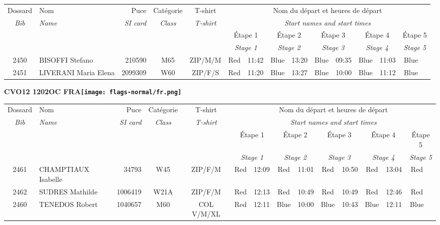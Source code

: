 \documentclass{report}
\begin{document}
  \begin{longtable}{|c|l|r|c|c|*{5}{cc|}}
    Dossard & Nom  & Puce    & Catégorie & T-shirt & \multicolumn{10}{c|}{Nom du départ et heures de départ} \\
    \itshape Bib     & \itshape Name & \itshape SI card & \itshape Class  & \itshape  T-shirt  & \multicolumn{10}{c|}{\itshape Start names and start times} \\
    \hline
    & & & & & \multicolumn{2}{c|}{Étape 1} & \multicolumn{2}{c|}{Étape 2} & \multicolumn{2}{c|}{Étape 3} & \multicolumn{2}{c|}{Étape 4} & \multicolumn{2}{c|}{Étape 5} \\
    & & & & & \multicolumn{2}{c|}{\itshape Stage 1} & \multicolumn{2}{c|}{\itshape Stage 2} & \multicolumn{2}{c|}{\itshape Stage 3} & \multicolumn{2}{c|}{\itshape Stage 4} & \multicolumn{2}{c|}{\itshape Stage 5} \\
    \hline
    2450 & BISOFFI Stefano & 210590 & M65 & ZIP/M/M & Red & 11:42 & Blue & 13:20 & Blue & 09:35 & Blue & 11:03 & Blue &  \\
    2451 & LIVERANI Maria Elena & 2099309 & W60 & ZIP/F/S & Red & 11:20 & Blue & 13:27 & Blue & 10:00 & Blue & 11:12 & Blue &  \\
  \end{longtable}
\newpage
  \Huge \centering \bfseries CVO12 1202OC FRA\normalfont \footnotesize \sffamily \hfill \texttt{[image: flags-normal/fr.png]} \newline 
  \begin{longtable}{|c|l|r|c|c|*{5}{cc|}}
    Dossard & Nom  & Puce    & Catégorie & T-shirt & \multicolumn{10}{c|}{Nom du départ et heures de départ} \\
    \itshape Bib     & \itshape Name & \itshape SI card & \itshape Class  & \itshape  T-shirt  & \multicolumn{10}{c|}{\itshape Start names and start times} \\
    \hline
    & & & & & \multicolumn{2}{c|}{Étape 1} & \multicolumn{2}{c|}{Étape 2} & \multicolumn{2}{c|}{Étape 3} & \multicolumn{2}{c|}{Étape 4} & \multicolumn{2}{c|}{Étape 5} \\
    & & & & & \multicolumn{2}{c|}{\itshape Stage 1} & \multicolumn{2}{c|}{\itshape Stage 2} & \multicolumn{2}{c|}{\itshape Stage 3} & \multicolumn{2}{c|}{\itshape Stage 4} & \multicolumn{2}{c|}{\itshape Stage 5} \\
    \hline
    2461 & CHAMPTIAUX Isabelle & 34793 & W45 & ZIP/F/M & Red & 12:09 & Red & 11:01 & Red & 10:50 & Red & 13:04 & Red &  \\
    2462 & SUDRES Mathilde & 1006419 & W21A & ZIP/F/M & Red & 12:13 & Red & 10:49 & Red & 10:49 & Red & 12:46 & Red &  \\
    2460 & TENEDOS Robert & 1040657 & M60 & COL V/M/XL & Red & 12:11 & Blue & 10:00 & Blue & 10:43 & Blue & 12:11 & Blue &  \\
  \end{longtable}
\end{document}
